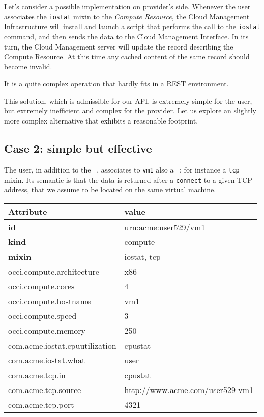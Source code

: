 \documentclass[10pt]{article}  %
\begin{document}
Let's consider a possible implementation on provider's side. Whenever the user associates the {\tt \small iostat} mixin to the {\em Compute Resource}, the Cloud Management Infrastructure will install and launch a script that performs the call to the {\tt \small iostat} command, and then sends the data to the Cloud Management Interface. In its turn, the Cloud Management server will update the record describing the Compute Resource. At this time any cached content of the same record should become invalid.

It is a quite complex operation that hardly fits in a REST environment.

This solution, which is admissible for our API, is extremely simple for the user, but extremely inefficient and complex for the provider. Let us explore an slightly more complex alternative that exhibits a reasonable footprint.

\subsection*{Case 2: simple but effective}

The user, in addition to the \metr\ \mi , associates to {\tt \small vm1} also a \publ\ \mi : for instance a {\tt \small tcp} mixin. Its semantic is that the data is returned after a {\tt \small connect} to a given TCP address, that we assume to be located on the same virtual machine.

{
\small
\begin{tabular}{l|l}
Attribute                         & value \\ \hline
{\bf id}                          & urn:acme:user529/vm1 \\
{\bf kind}                        & compute \\
{\bf mixin}                       & iostat, tcp \\
occi.compute.architecture         & x86   \\
occi.compute.cores                & 4     \\ 
occi.compute.hostname             & vm1   \\            
occi.compute.speed                & 3     \\                  
occi.compute.memory               & 250   \\
com.acme.iostat.cpuutilization    & cpustat   \\                     
com.acme.iostat.what              & user  \\
com.acme.tcp.in                   & cpustat \\
com.acme.tcp.source               & http://www.acme.com/user529-vm1 \\
com.acme.tcp.port                 & 4321 \\
\end{tabular}
}
\end{document}
